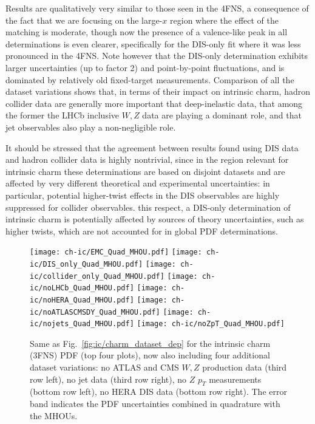 Results are qualitatively very similar to those seen in the 4FNS, a
consequence of the fact that we are focusing on the large-$x$ region where the
effect of the matching is moderate, though now the presence of a
valence-like peak in all determinations is even clearer, specifically
for the DIS-only fit where it was less pronounced in the 4FNS.
%
 Note however that the DIS-only determination
  exhibits larger uncertainties
  (up to factor 2) and point-by-point fluctuations,
  and is dominated by relatively old fixed-target measurements.
%
Comparison of all the dataset variations shows that, in terms of their
impact on intrinsic charm,
hadron collider data are generally more important
that deep-inelastic data, that among the former the
LHCb inclusive $W,Z$ data are playing a dominant role,
and that jet observables also play a non-negligible role.

It should be stressed that the agreement between results found using
DIS data and hadron collider data is highly nontrivial, since in the region
relevant for intrinsic charm these determinations are based on disjoint datasets
and are  affected by
very different theoretical and experimental uncertainties:
in particular, potential higher-twist
effects in the DIS observables are highly suppressed for collider observables.
%
 this respect, a DIS-only determination of intrinsic charm
  is potentially affected by sources of theory uncertainties, such as higher twists,
which are not accounted for in global PDF determinations.

\begin{figure}[h]
  \begin{center}
    \texttt{[image: ch-ic/EMC\_Quad\_MHOU.pdf]}
    \texttt{[image: ch-ic/DIS\_only\_Quad\_MHOU.pdf]}
    \texttt{[image: ch-ic/collider\_only\_Quad\_MHOU.pdf]}
    \texttt{[image: ch-ic/noLHCb\_Quad\_MHOU.pdf]}
    \texttt{[image: ch-ic/noHERA\_Quad\_MHOU.pdf]}
    \texttt{[image: ch-ic/noATLASCMSDY\_Quad\_MHOU.pdf]}
    \texttt{[image: ch-ic/nojets\_Quad\_MHOU.pdf]}
    \texttt{[image: ch-ic/noZpT\_Quad\_MHOU.pdf]}
    \caption{\small Same as Fig.~\ref{fig:ic/charm_dataset_dep}
      for the intrinsic charm (3FNS) PDF (top four plots), now also including
      four additional dataset variations:  no ATLAS and CMS $W, Z$
      production data   (third row left),
      no jet data (third row right), no $Z$ $p_T$
      measurements (bottom row left), no HERA
      DIS data (bottom row right).
The error band indicates the PDF uncertainties combined in quadrature with the MHOUs.
\label{fig:ic/charm_dataset_dep_nf3} }
\end{center}
\end{figure}

